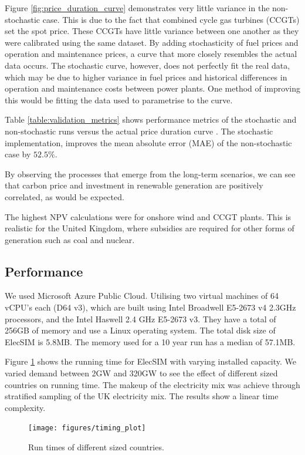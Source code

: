 Figure \ref{fig:price_duration_curve} demonstrates very little variance in the non-stochastic case. This is due to the fact that combined cycle gas turbines (CCGTs) set the spot price. These CCGTs have little variance between one another as they were calibrated using the same dataset. By adding stochasticity of fuel prices and operation and maintenance prices, a curve that more closely resembles the actual data occurs. The stochastic curve, however, does not perfectly fit the real data, which may be due to higher variance in fuel prices and historical differences in operation and maintenance costs between power plants. One method of improving this would be fitting the data used to parametrise to the curve.

Table \ref{table:validation_metrics} shows performance metrics of the stochastic and non-stochastic runs versus the actual price duration curve . The stochastic implementation, improves the mean absolute error (MAE) of the non-stochastic case by $52.5\%$.

By observing the processes that emerge from the long-term scenarios, we can see that carbon price and investment in renewable generation are positively correlated, as would be expected.

The highest NPV calculations were for onshore wind and CCGT plants. This is realistic for the United Kingdom, where subsidies are required for other forms of generation such as coal and nuclear.

\subsection{Performance}

 We used Microsoft Azure Public Cloud. Utilising two virtual machines of 64 vCPU's each (D64 v3), which are built using Intel Broadwell E5-2673 v4 2.3GHz processors, and the Intel Haswell 2.4 GHz E5-2673 v3. They have a total of 256GB of memory and use a Linux operating system. The total disk size of ElecSIM is 5.8MB. The memory used for a 10 year run has a median of 57.1MB.




Figure \ref{fig:timingplot} shows the running time for ElecSIM with varying installed capacity. We varied demand between 2GW and 320GW to see the effect of different sized countries on running time. The makeup of the electricity mix was achieve through stratified sampling of the UK electricity mix. The results show a linear time complexity. 

\begin{figure}
	\centering
	\texttt{[image: figures/timing\_plot]}
	\caption{Run times of different sized countries.}
	\label{fig:timingplot}
\end{figure}

